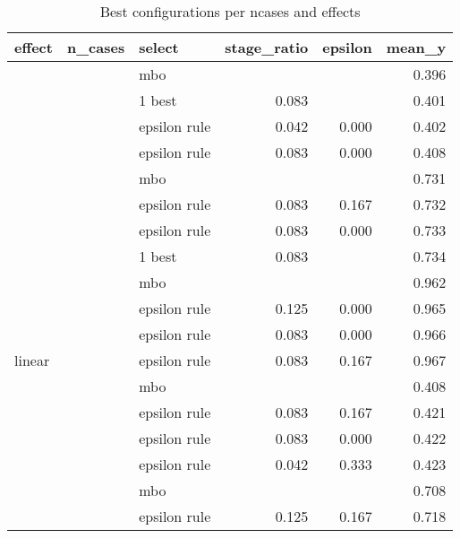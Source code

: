 \begin{table}

\caption{\label{tab:table_best}Best configurations per ncases and effects}
\centering
\fontsize{6}{8}\selectfont
\begin{tabular}[t]{lrlrrr}
\toprule
effect & n\_cases & select & stage\_ratio & epsilon & mean\_y\\
\midrule
 &  & mbo &  &  & 0.396\\

 &  & 1 best & 0.083 &  & 0.401\\

 &  & epsilon rule & 0.042 & 0.000 & 0.402\\

 & \multirow{-4}{*}{\raggedleft\arraybackslash 500} & epsilon rule & 0.083 & 0.000 & 0.408\\
\cmidrule{2-6}
 &  & mbo &  &  & 0.731\\

 &  & epsilon rule & 0.083 & 0.167 & 0.732\\

 &  & epsilon rule & 0.083 & 0.000 & 0.733\\

 & \multirow{-4}{*}{\raggedleft\arraybackslash 1000} & 1 best & 0.083 &  & 0.734\\
\cmidrule{2-6}
 &  & mbo &  &  & 0.962\\

 &  & epsilon rule & 0.125 & 0.000 & 0.965\\

 &  & epsilon rule & 0.083 & 0.000 & 0.966\\

\multirow{-12}{*}{\raggedright\arraybackslash linear} & \multirow{-4}{*}{\raggedleft\arraybackslash 2000} & epsilon rule & 0.083 & 0.167 & 0.967\\
\cmidrule{1-6}
 &  & mbo &  &  & 0.408\\

 &  & epsilon rule & 0.083 & 0.167 & 0.421\\

 &  & epsilon rule & 0.083 & 0.000 & 0.422\\

 & \multirow{-4}{*}{\raggedleft\arraybackslash 500} & epsilon rule & 0.042 & 0.333 & 0.423\\
\cmidrule{2-6}
 &  & mbo &  &  & 0.708\\

 &  & epsilon rule & 0.125 & 0.167 & 0.718\\


\end{tabular}
\end{table}
